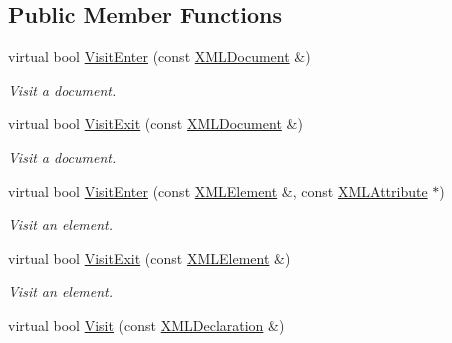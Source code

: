 \subsection*{Public Member Functions}
\begin{DoxyCompactItemize}
\item 
virtual bool \hyperlink{classtinyxml2_1_1XMLVisitor_acb3c22fc5f60eb9db98f533f2761f67d}{Visit\+Enter} (const \hyperlink{classtinyxml2_1_1XMLDocument}{X\+M\+L\+Document} \&)\hypertarget{classtinyxml2_1_1XMLVisitor_acb3c22fc5f60eb9db98f533f2761f67d}{}\label{classtinyxml2_1_1XMLVisitor_acb3c22fc5f60eb9db98f533f2761f67d}

\begin{DoxyCompactList}\small\item\em Visit a document. \end{DoxyCompactList}\item 
virtual bool \hyperlink{classtinyxml2_1_1XMLVisitor_a170e9989cd046ba904f302d087e07086}{Visit\+Exit} (const \hyperlink{classtinyxml2_1_1XMLDocument}{X\+M\+L\+Document} \&)\hypertarget{classtinyxml2_1_1XMLVisitor_a170e9989cd046ba904f302d087e07086}{}\label{classtinyxml2_1_1XMLVisitor_a170e9989cd046ba904f302d087e07086}

\begin{DoxyCompactList}\small\item\em Visit a document. \end{DoxyCompactList}\item 
virtual bool \hyperlink{classtinyxml2_1_1XMLVisitor_af97980a17dd4e37448b181f5ddfa92b5}{Visit\+Enter} (const \hyperlink{classtinyxml2_1_1XMLElement}{X\+M\+L\+Element} \&, const \hyperlink{classtinyxml2_1_1XMLAttribute}{X\+M\+L\+Attribute} $\ast$)\hypertarget{classtinyxml2_1_1XMLVisitor_af97980a17dd4e37448b181f5ddfa92b5}{}\label{classtinyxml2_1_1XMLVisitor_af97980a17dd4e37448b181f5ddfa92b5}

\begin{DoxyCompactList}\small\item\em Visit an element. \end{DoxyCompactList}\item 
virtual bool \hyperlink{classtinyxml2_1_1XMLVisitor_a772f10ddc83f881956d32628faa16eb6}{Visit\+Exit} (const \hyperlink{classtinyxml2_1_1XMLElement}{X\+M\+L\+Element} \&)\hypertarget{classtinyxml2_1_1XMLVisitor_a772f10ddc83f881956d32628faa16eb6}{}\label{classtinyxml2_1_1XMLVisitor_a772f10ddc83f881956d32628faa16eb6}

\begin{DoxyCompactList}\small\item\em Visit an element. \end{DoxyCompactList}\item 
virtual bool \hyperlink{classtinyxml2_1_1XMLVisitor_adc75bd459fc7ba8223b50f0616767f9a}{Visit} (const \hyperlink{classtinyxml2_1_1XMLDeclaration}{X\+M\+L\+Declaration} \&)\hypertarget{classtinyxml2_1_1XMLVisitor_adc75bd459fc7ba8223b50f0616767f9a}{}\label{classtinyxml2_1_1XMLVisitor_adc75bd459fc7ba8223b50f0616767f9a}


\end{DoxyCompactItemize}

